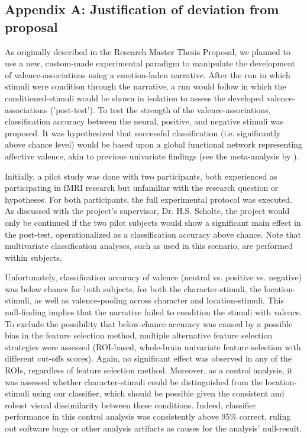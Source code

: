 \documentclass[jou,12pt,a4paper]{apa6}
\begin{document}
\subsection{\LARGE \textnormal{Appendix A: Justification of deviation from proposal}}
\vspace{10px}

\noindent As originally described in the Research Master Thesis Proposal, we planned to use a new, custom-made experimental paradigm to manipulate the development of valence-associations using a emotion-laden narrative. After the run in which stimuli were condition through the narrative, a run would follow in which the conditioned-stimuli would be shown in isolation to assess the developed valence-associations ('post-test'). To test the strength of the valence-associations, classification accuracy between the neural, positive, and negative stimuli was proposed. It was hypothesized that successful classification (i.e. significantly above chance level) would be based upon a global functional network representing affective valence, akin to previous univariate findings (see the meta-analysis by ). 

Initially, a pilot study was done with two participants, both experienced as participating in fMRI research but unfamiliar with the research question or hypotheses. For both participants, the full experimental protocol was executed. As discussed with the project's supervisor, Dr. H.S. Scholte, the project would only be continued if the two pilot subjects would show a significant main effect in the post-test, operationalized as a classification accuracy above chance. Note that multivariate classification analyses, such as used in this scenario, are performed within subjects.   

Unfortunately, classification accuracy of valence (neutral vs. positive vs. negative) was below chance for both subjects, for both the character-stimuli, the location-stimuli, as well as valence-pooling across character and location-stimuli. This null-finding implies that the narrative failed to condition the stimuli with valence. To exclude the possibility that below-chance accuracy was caused by a possible bias in the feature selection method, multiple alternative feature selection strategies were assessed (ROI-based, whole-brain univariate feature selection with different cut-offs scores). Again, no significant effect was observed in any of the ROIs, regardless of feature selection method. Moreover, as a control analysis, it was assessed whether character-stimuli could be distinguished from the location-stimuli using our classifier, which should be possible given the consistent and robust visual dissimilarity between these conditions. Indeed, classifier performance in this control analysis was consistently above 95\% correct, ruling out software bugs or other analysis artifacts as causes for the analysis' null-result.
\end{document}
